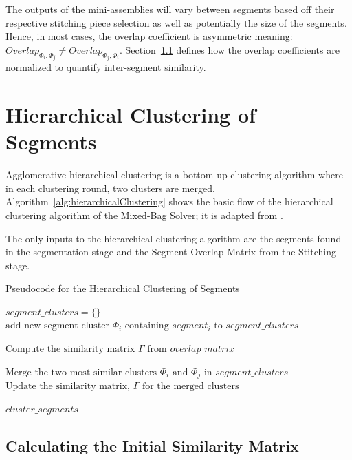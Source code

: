 The outputs of the mini-assemblies will vary between segments based off their respective stitching piece selection as well as potentially the size of the segments.  Hence, in most cases, the overlap coefficient is asymmetric meaning: $Overlap_{\Phi_i,\Phi_j} \neq Overlap_{\Phi_j,\Phi_i}$.  Section~\ref{sec:quantifyingSegmentSimilarity} defines how the overlap coefficients are normalized to quantify inter-segment similarity.

\section{Hierarchical Clustering of Segments}\label{sec:hierarchicalClustering}

Agglomerative hierarchical clustering is a bottom-up clustering algorithm where in each clustering round, two clusters are merged.  Algorithm~\ref{alg:hierarchicalClustering} shows the basic flow of the hierarchical clustering algorithm of the Mixed-Bag Solver; it is adapted from \cite{tanIntroToDataMining}.  

The only inputs to the hierarchical clustering algorithm are the segments found in the segmentation stage and the Segment Overlap Matrix from the Stitching stage.

\begin{algorithm}[tb]
\caption{Pseudocode for the Hierarchical Clustering of Segments}\label{alg:hierarchicalClustering}
\begin{algorithmic}[1]
	\State $\textit{segment\_clusters} = \{ \}$	
		\State $\text{add new segment cluster } \Phi_i \text{ containing } segment_i \text{ to } \textit{segment\_clusters}$
	\EndFor
\item[]
    \State $\text{Compute the similarity matrix } \Gamma \text{ from } overlap\_matrix$
\item[]
    	\State $\text{Merge the two most similar clusters } \Phi_i \text{ and } \Phi_j \text{ in } \textit{segment\_clusters}$
    	\State $\text{Update the similarity matrix, } \Gamma \text{ for the merged clusters}$
	\EndWhile
\item[]
    \State \Return $\textit{cluster\_segments}$
\EndFunction
\end{algorithmic}
\end{algorithm}

\subsection{Calculating the Initial Similarity Matrix}\label{sec:quantifyingSegmentSimilarity}

